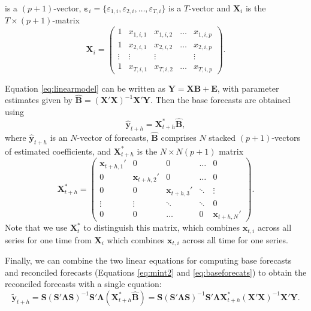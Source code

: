 \documentclass[11pt,a4paper,]{article}
\begin{document}
is a \((p+1)\)-vector,
\({\bm{\varepsilon}}_i = \{\varepsilon_{1,i}, \varepsilon_{2,i}, \dots, \varepsilon_{T,i}\}\)
is a \(T\)-vector and \(\bm{X}_i\) is the \(T\times (p+1)\)-matrix
\begin{equation}\label{eq:Xmatrixdefinition}
  \bm{X}_i = \begin{pmatrix}
  1 & x_{1,i,1} & x_{1,i,2} & \dots & x_{1,i,p}\\
  1 & x_{2,i,1} & x_{2,i,2} & \dots & x_{2,i,p}\\
  \vdots & \vdots & \vdots & & \vdots \\
  1 & x_{T,i,1} & x_{T,i,2} & \dots & x_{T,i,p}
\end{pmatrix}.
\end{equation}

Equation \eqref{eq:linearmodel} can be written as
\(\bm{Y} = \bm{X} \bm{B} + \bm{E}\), with parameter estimates given by
\(\hat{\bm{B}} = (\bm{X}'\bm{X})^{-1} \bm{X}'\bm{Y}\). Then the base
forecasts are obtained using \begin{equation}\label{eq:baseforecats}
  \hat{\bm{y}}_{t+h} = \bm{X}_{t+h}^* \hat{\bm{B}},
\end{equation} where \(\hat{\bm{y}}_{t+h}\) is an \(N\)-vector of
forecasts, \(\hat{\bm{B}}\) comprises \(N\) stacked \((p+1)\)-vectors of
estimated coefficients, and \(\bm{X}_{t+h}^*\) is the \(N\times N(p+1)\)
matrix \pagebreak[3]\begin{equation}
  \bm{X}_{t+h}^* =
  \begin{pmatrix}
  \bm{x}_{t+h,1}' & 0               & 0               & \dots  & 0\\
  0               & \bm{x}_{t+h,2}' & 0               & \dots  & 0\\
  0               & 0               & \bm{x}_{t+h,3}' & \ddots & \vdots \\
  \vdots          & \vdots          & \ddots          & \ddots & 0\\
  0               & 0               & \dots           & 0      & \bm{x}_{t+h,N}'
  \end{pmatrix}.
\end{equation} Note that we use \(\bm{X}^*_{t}\) to distinguish this
matrix, which combines \(\bm{x}_{t,i}\) across all series for one time
from \(\bm{X}_i\) which combines \(\bm{x}_{t,i}\) across all time for
one series.

Finally, we can combine the two linear equations for computing base
forecasts and reconciled forecasts (Equations \eqref{eq:mint2} and
\eqref{eq:baseforecats}) to obtain the reconciled forecasts with a single
equation: \begin{equation}\label{eq:singlestep}
    \tilde{\bm{y}}_{t+h} = \bm{S}(\bm{S}'\bm{\Lambda}\bm{S})^{-1}\bm{S}'\bm{\Lambda}
                            (\bm{X}_{t+h}^* \hat{\bm{B}})
                         = \bm{S}(\bm{S}'\bm{\Lambda}\bm{S})^{-1}\bm{S}'\bm{\Lambda}
                            \bm{X}_{t+h}^* (\bm{X}'\bm{X})^{-1} \bm{X}'\bm{Y}.
\end{equation}
\end{document}
